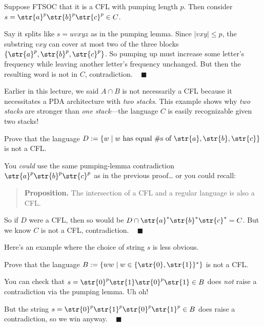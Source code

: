 \begin{solution}
    Suppose FTSOC that it is a CFL with pumping length $p$.
    Then consider $s = \str{a}^p\str{b}^p\str{c}^p \in C$.

    Say it splits like $s = uvxyz$ as in the pumping lemma.
    Since $|vxy| \leq p$, the substring $vxy$
    can cover at most two of the three blocks
    $\{\str{a}^p, \str{b}^p, \str{c}^p\}$.
    So pumping up must increase some letter's frequency
    while leaving another letter's frequency unchanged.
    But then the resulting word is not in $C$, contradiction. ~ $\blacksquare$
\end{solution}

\begin{remark}
    Earlier in this lecture, we said
    $A \cap B$ is not necessarily a CFL because
    it necessitates a PDA architecture with \emph{two stacks}.
    This example shows why \emph{two stacks} are stronger than
    \emph{one stack}---the language $C$ is easily recognizable
    given two stacks!
\end{remark}

\begin{problem}
    Prove that the language
    $D := \{w \mid w \text{ has equal \#s of }
    \str{a}, \str{b}, \str{c}\}$
    is not a CFL.
\end{problem}

\begin{solution}
    You \emph{could} use the same pumping-lemma contradiction
    $\str{a}^p\str{b}^p\str{c}^p$ as in the previous proof\dots
    or you could recall:
    \begin{quote}
        \textbf{Proposition.}
        The intersection of a CFL and a regular language is also a CFL.
    \end{quote}
    So if $D$ were a CFL, then so would be
    $D \cap \str{a}^*\str{b}^*\str{c}^* = C$.
    But we know $C$ is not a CFL, contradiction. ~ $\blacksquare$
\end{solution}

Here's an example where the choice of string $s$ is less obvious.

\begin{problem}
    Prove that the language
    $B := \{ww \mid w \in \{\str{0}, \str{1}\}^*\}$ is not a CFL.
\end{problem}

\begin{solution}
    You can check that
    $s = \str{0}^p\str{1}\str{0}^p\str{1} \in B$ does \emph{not} raise
    a contradiction via the pumping lemma.  Uh oh!

    But the string $s = \str{0}^p\str{1}^p\str{0}^p\str{1}^p \in B$
    does raise a contradiction, so we win anyway. ~ $\blacksquare$
\end{solution}


